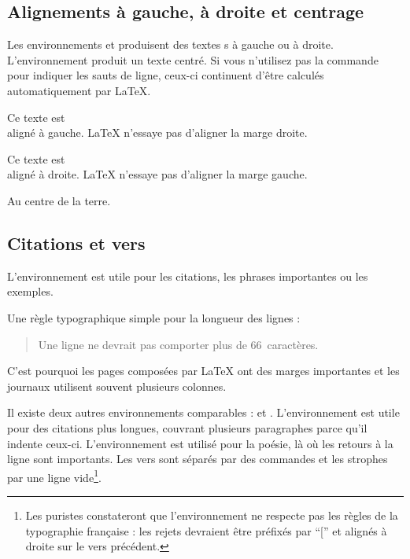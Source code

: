 \subsection{Alignements à gauche, à droite et centrage}

Les environnements  et  produisent des
textes s à gauche ou à droite. L'environnement 
produit un texte centré. Si vous n'utilisez pas la commande \ci{\bs}
pour indiquer les sauts de ligne, ceux-ci continuent d'être calculés
automatiquement par \LaTeX{}.

\begin{example}
\begin{flushleft}
Ce texte est\\
aligné à gauche.
\LaTeX{} n'essaye pas
d'aligner la marge droite.
\end{flushleft}
\end{example}

\begin{example}
\begin{flushright}
Ce texte est\\
aligné à droite.
\LaTeX{} n'essaye pas
d'aligner la marge gauche.
\end{flushright}
\end{example}

\begin{example}
\begin{center}
Au centre de la terre.
\end{center}
\end{example}

\subsection{Citations et vers}

L'environnement  est utile pour les citations, les phrases
importantes ou les exemples.

\begin{example}
Une règle typographique
simple pour la longueur
des lignes :
\begin{quote}
Une ligne ne devrait pas comporter
plus de 66~caractères.
\end{quote}
C'est pourquoi les pages
composées par \LaTeX{} ont des
marges importantes et
les journaux utilisent
souvent plusieurs colonnes.
\end{example}

Il existe deux autres environnements comparables :  et
. L'environnement  est utile pour des
citations plus longues, couvrant plusieurs
paragraphes parce qu'il indente ceux-ci.
L'environnement  est utilisé pour la poésie, là
où les retours à la ligne sont importants. Les vers sont séparés par
des commandes \ci{\bs} et les strophes par une ligne vide\footnote{Les
puristes constateront que l'environnement  ne respecte pas
les règles de la typographie française : les rejets devraient être
préfixés par \enquote{[\iffalse]\fi} et alignés à droite sur le vers précédent.}.

